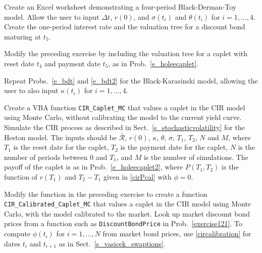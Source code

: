 \begin{prob} Create an Excel worksheet demonstrating a four-period Black-Derman-Toy model.  Allow the user to input $\varDelta t$, $r(0)$, and $\sigma(t_i)$ and $\theta(t_i)$ for $i=1,\ldots, 4$.  Create the one-period interest rate and the valuation tree for a discount bond maturing at $t_5$. \label{e_bdt}
\end{prob}
\begin{prob}Modify the preceding exercise by including the valuation tree for a caplet with reset date $t_4$ and payment date $t_5$, as in Prob.~\ref{e_holeecaplet}. \label{e_bdt2}
\end{prob}\begin{prob}
Repeat Probs.~\ref{e_bdt} and \ref{e_bdt2} for the Black-Karasinski model, allowing the user to also input $\kappa(t_i)$ for $i=1,\ldots, 4$.
\end{prob}\begin{prob}
Create a VBA function \verb!CIR_Caplet_MC! that values a caplet in the CIR model using Monte Carlo, without calibrating the model to the current yield curve.  Simulate the CIR process as described in Sect.~\ref{s_stochasticvolatility} for the Heston model.  The inputs should be $\bar{\mathcal{R}}$, $r(0)$, $\kappa$, $\theta$, $\sigma$, $T_1$, $T_2$, $N$ and $M$, where $T_1$ is the reset date for the caplet, $T_2$ is the payment date for the caplet, $N$ is the number of periods between 0 and $T_1$, and $M$ is the number of simulations.  The payoff of the caplet is as in Prob.~\ref{e_holeecaplet2}, where $P(T_1,T_2)$ is the function of $r(T_1)$ and $T_2-T_1$ given in \eqref{cirPcal} with $\phi=0$. 
\end{prob}
\begin{prob}Modify the function in the preceding exercise to create a function \verb!CIR_Calibrated_Caplet_MC! that values a caplet in the CIR model using Monte Carlo, with the model calibrated to the market.  Look up market discount bond prices from a function such as \verb!DiscountBondPrice! in Prob.~\ref{exercise121}.  To compute $\phi(t_i)$ for $i=1,\ldots, N$ from market bond prices, use \eqref{circalibration} for dates $t_i$ and $t_{i+1}$ as in Sect.~\ref{s_vasicek_swaptions}.
\end{prob}